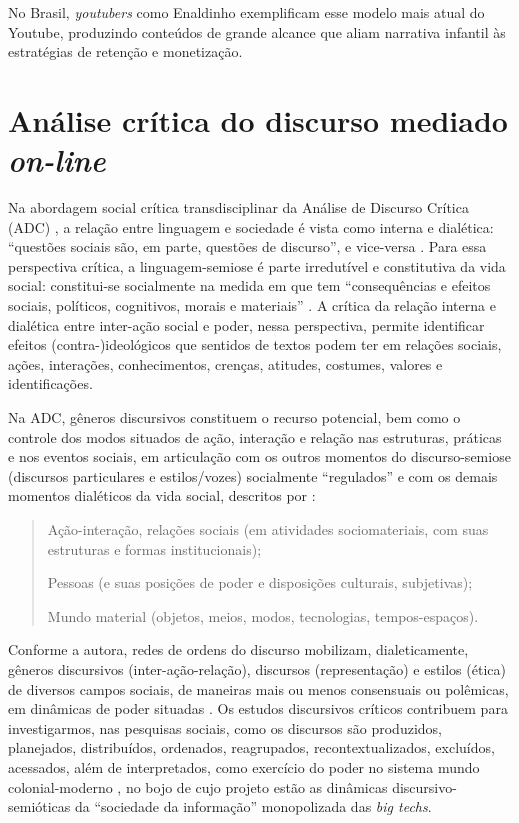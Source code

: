 \documentclass[portuguese]{textolivre}
\begin{document}
No Brasil, \textit{youtubers} como Enaldinho exemplificam esse modelo mais atual do Youtube, produzindo conteúdos de grande alcance que aliam narrativa infantil às estratégias de retenção e monetização.

\section{Análise crítica do discurso mediado \textit{on-line}}\label{sec-conduta}
Na abordagem social crítica transdisciplinar da Análise de Discurso Crítica (ADC) \cite{VieiraResende2016AnaliseDiscursoCritica,SilvaVieira2019Multimodalidade}, a relação entre linguagem e sociedade é vista como interna e dialética: “questões sociais são, em parte, questões de discurso”, e vice-versa \cite[p. VII]{ChouliarakiFairclough1999DiscourseLateModernity}. Para essa perspectiva crítica, a linguagem-semiose é parte irredutível e constitutiva da vida social: constitui-se socialmente na medida em que tem “consequências e efeitos sociais, políticos, cognitivos, morais e materiais” \cite[p. 14]{Fairclough2003AnalysingDiscourse}. A crítica da relação interna e dialética entre inter-ação social e poder, nessa perspectiva, permite identificar efeitos (contra-)ideológicos que sentidos de textos podem ter em relações sociais, ações, interações, conhecimentos, crenças, atitudes, costumes, valores e identificações.

Na ADC, gêneros discursivos constituem o recurso potencial, bem como o controle dos modos situados de ação, interação e relação nas estruturas, práticas e nos eventos sociais, em articulação com os outros momentos do discurso-semiose (discursos particulares e estilos/vozes) socialmente “regulados” e com os demais momentos dialéticos da vida social, descritos por \textcite[p. 95]{Vieira2024Decolonial}:

\begin{quote}
    Ação-interação, relações sociais (em atividades sociomateriais, com suas estruturas e formas institucionais);

Pessoas (e suas posições de poder e disposições culturais, subjetivas);

Mundo material (objetos, meios, modos, tecnologias, tempos-espaços).
\end{quote}

Conforme a autora, redes de ordens do discurso mobilizam, dialeticamente, gêneros discursivos (inter-ação-relação), discursos (representação) e estilos (ética) de diversos campos sociais, de maneiras mais ou menos consensuais ou polêmicas, em dinâmicas de poder situadas \cite{Vieira2024Decolonial}. Os estudos discursivos críticos contribuem para investigarmos, nas pesquisas sociais, como os discursos são produzidos, planejados, distribuídos, ordenados, reagrupados, recontextualizados, excluídos, acessados, além de interpretados, como exercício do poder \cite{VanDijck2013CultureConnectivity} no sistema mundo colonial-moderno \cite{Segato2012GeneroColonialidade}, no bojo de cujo projeto estão as dinâmicas discursivo-semióticas da “sociedade da informação” monopolizada das \textit{big techs}.
\end{document}
